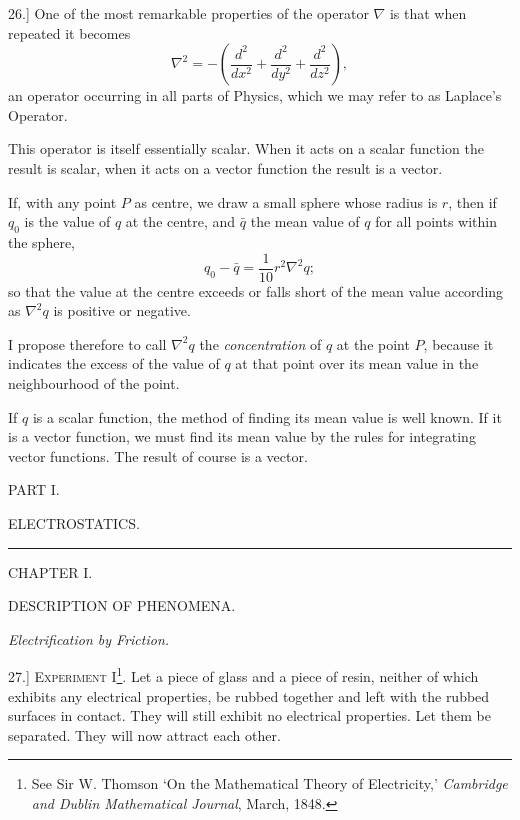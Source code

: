 \documentclass[11pt,a4paper]{article}
\begin{document}
26.] One of the most remarkable properties of the operator \(\nabla\)
is that when repeated it becomes
\[
\nabla^2=-\left(\frac{d^2}{dx^2}+\frac{d^2}{dy^2}
+\frac{d^2}{dz^2}\right),
\]
an operator occurring in all parts of Physics, which we may refer to as
Laplace's Operator.

This operator is itself essentially scalar. When it acts on a scalar
function the result is scalar, when it acts on a vector function the
result is a vector.

If, with any point \(P\) as centre, we draw a small sphere whose radius
is \(r\), then if \(q_0\) is the value of \(q\) at the centre, and
\(\bar{q}\) the mean value of \(q\) for all points within the sphere,
\[
q_0-\bar{q}=\frac{1}{10}r^2\nabla^2 q;
\]
so that the value at the centre exceeds or falls short of the mean value
according as \(\nabla^2 q\) is positive or negative.

I propose therefore to call \(\nabla^2q\) the \textit{concentration} of
\(q\) at the point \(P\), because it indicates the excess of the value
of \(q\) at that point over its mean value in the neighbourhood of the
point.

If \(q\) is a scalar function, the method of finding its mean value is
well known. If it is a vector function, we must find its mean value by
the rules for integrating vector functions. The result of course is a
vector.

\clearpage
\setcounter{footnote}{0}

\begin{center}
{\Large PART I.}

\vspace{1.4em}

{\Large ELECTROSTATICS.}

\vspace{2.0em}

\rule{0.46\textwidth}{0.4pt}

\vspace{2.0em}

{\Large CHAPTER I.}

\vspace{1.4em}

{\large DESCRIPTION OF PHENOMENA.}

\vspace{1.4em}

\textit{Electrification by Friction.}
\end{center}

27.] \textsc{Experiment I}\footnote{See Sir W. Thomson `On the
Mathematical Theory of Electricity,' \textit{Cambridge and Dublin
Mathematical Journal}, March, 1848.}. Let a piece of glass and a piece
of resin, neither of which exhibits any electrical properties, be rubbed
together and left with the rubbed surfaces in contact. They will still
exhibit no electrical properties. Let them be separated. They will now
attract each other.
\end{document}
